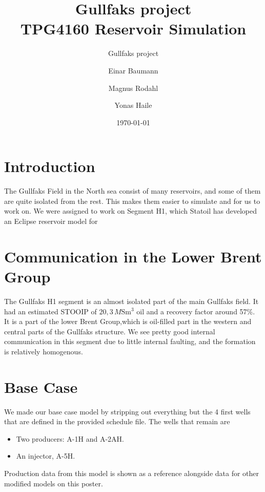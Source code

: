 \documentclass[final]{beamer}
\title[]{{\huge Gullfaks project} \\ \vspace{0.3em} {\large TPG4160 Reservoir Simulation}}
\subtitle{Gullfaks project}
\author{Einar Baumann \and Magnus Rodahl \and Yonas Haile}
\institute[]{Norwegian University of Science and Technology}
\date{\today}
\begin{document}
\begin{frame}[t]
\begin{multicols}{3}





\section{Introduction} %
The Gullfaks Field in the North sea consist of many reservoirs, and some of them are quite isolated from the rest. This makes them easier to simulate and for us to work on. We were assigned to work on Segment H1, which Statoil has developed an Eclipse reservoir model for



\section{Communication in the Lower Brent Group}
The Gullfaks H1 segment is an almost isolated part of the main Gullfaks field. It had an estimated STOOIP of $20,3 \,M\mathrm{Sm^3}$ oil and a recovery factor around 57\%. It is a part of the lower Brent Group,which is oil-filled part in the western and central parts of the Gullfaks structure. We see pretty good internal communication in this segment due to little internal faulting, and the formation is relatively homogenous.










\section{Base Case}
We made our base case model by stripping out everything but the 4 first wells  that are defined in the provided schedule file. The wells that remain are
\begin{itemize}
  \item Two producers: A-1H and A-2AH.
  \item An injector, A-5H.
\end{itemize}
Production data from this model is shown as a reference alongside data for other modified models on this poster.










\end{multicols}
\end{frame}
\end{document}

